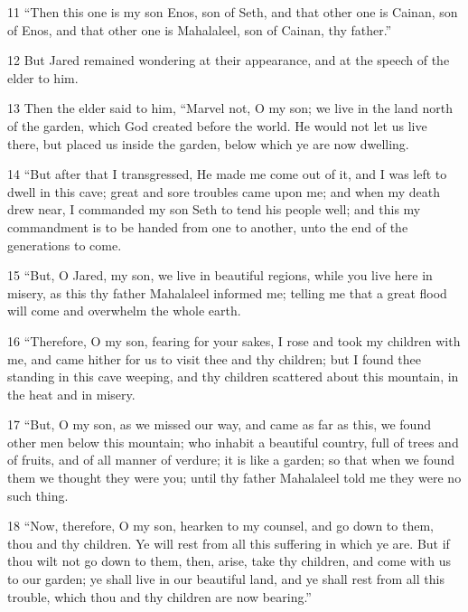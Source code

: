 \par 11 “Then this one is my son Enos, son of Seth, and that other one is Cainan, son of Enos, and that other one is Mahalaleel, son of Cainan, thy father.”

\par 12 But Jared remained wondering at their appearance, and at the speech of the elder to him.

\par 13 Then the elder said to him, “Marvel not, O my son; we live in the land north of the garden, which God created before the world. He would not let us live there, but placed us inside the garden, below which ye are now dwelling.

\par 14 “But after that I transgressed, He made me come out of it, and I was left to dwell in this cave; great and sore troubles came upon me; and when my death drew near, I commanded my son Seth to tend his people well; and this my commandment is to be handed from one to another, unto the end of the generations to come.

\par 15 “But, O Jared, my son, we live in beautiful regions, while you live here in misery, as this thy father Mahalaleel informed me; telling me that a great flood will come and overwhelm the whole earth.

\par 16 “Therefore, O my son, fearing for your sakes, I rose and took my children with me, and came hither for us to visit thee and thy children; but I found thee standing in this cave weeping, and thy children scattered about this mountain, in the heat and in misery.

\par 17 “But, O my son, as we missed our way, and came as far as this, we found other men below this mountain; who inhabit a beautiful country, full of trees and of fruits, and of all manner of verdure; it is like a garden; so that when we found them we thought they were you; until thy father Mahalaleel told me they were no such thing.

\par 18 “Now, therefore, O my son, hearken to my counsel, and go down to them, thou and thy children. Ye will rest from all this suffering in which ye are. But if thou wilt not go down to them, then, arise, take thy children, and come with us to our garden; ye shall live in our beautiful land, and ye shall rest from all this trouble, which thou and thy children are now bearing.”

